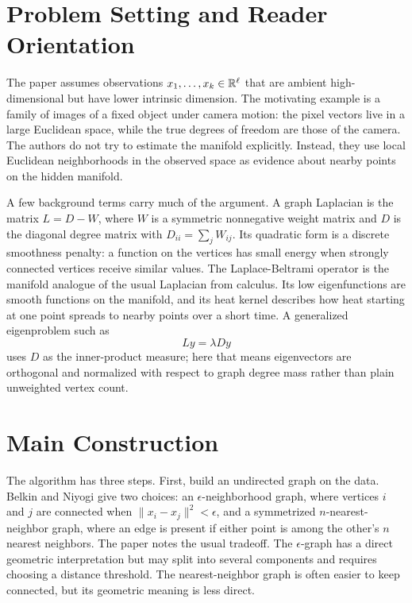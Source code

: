 \documentclass[11pt]{article}
\begin{document}
\section{Problem Setting and Reader Orientation}

The paper assumes observations \(x_1,\ldots,x_k\in\mathbb{R}^\ell\) that are ambient
high-dimensional but have lower intrinsic dimension. The motivating example is
a family of images of a fixed object under camera motion: the pixel vectors live
in a large Euclidean space, while the true degrees of freedom are those of the
camera. The authors do not try to estimate the manifold explicitly. Instead,
they use local Euclidean neighborhoods in the observed space as evidence about
nearby points on the hidden manifold.

A few background terms carry much of the argument. A graph Laplacian is the
matrix \(L=D-W\), where \(W\) is a symmetric nonnegative weight matrix and
\(D\) is the diagonal degree matrix with \(D_{ii}=\sum_j W_{ij}\). Its quadratic
form is a discrete smoothness penalty: a function on the vertices has small
energy when strongly connected vertices receive similar values. The
Laplace-Beltrami operator is the manifold analogue of the usual Laplacian from
calculus. Its low eigenfunctions are smooth functions on the manifold, and its
heat kernel describes how heat starting at one point spreads to nearby points
over a short time. A generalized eigenproblem such as
\[
  Ly=\lambda D y
\]
uses \(D\) as the inner-product measure; here that means eigenvectors are
orthogonal and normalized with respect to graph degree mass rather than plain
unweighted vertex count.

\section{Main Construction}

The algorithm has three steps. First, build an undirected graph on the data.
Belkin and Niyogi give two choices: an \(\epsilon\)-neighborhood graph, where
vertices \(i\) and \(j\) are connected when \(\|x_i-x_j\|^2<\epsilon\), and a
symmetrized \(n\)-nearest-neighbor graph, where an edge is present if either
point is among the other's \(n\) nearest neighbors. The paper notes the usual
tradeoff. The \(\epsilon\)-graph has a direct geometric interpretation but may
split into several components and requires choosing a distance threshold. The
nearest-neighbor graph is often easier to keep connected, but its geometric
meaning is less direct.
\end{document}

